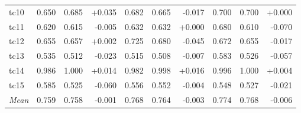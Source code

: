 \begin{table}[ht]
{\begin{tabular}{l rrr rrr rrr}
tc10 & 0.650 & 0.685 & +0.035 & 0.682 & 0.665 & -0.017 & 0.700 & 0.700 & +0.000 \\
tc11 & 0.620 & 0.615 & -0.005 & 0.632 & 0.632 & +0.000 & 0.680 & 0.610 & -0.070 \\
tc12 & 0.655 & 0.657 & +0.002 & 0.725 & 0.680 & -0.045 & 0.672 & 0.655 & -0.017 \\
tc13 & 0.535 & 0.512 & -0.023 & 0.515 & 0.508 & -0.007 & 0.583 & 0.526 & -0.057 \\
tc14 & 0.986 & 1.000 & +0.014 & 0.982 & 0.998 & +0.016 & 0.996 & 1.000 & +0.004 \\
tc15 & 0.585 & 0.525 & -0.060 & 0.556 & 0.552 & -0.004 & 0.548 & 0.527 & -0.021 \\
\midrule
\textit{Mean} & 0.759 & 0.758 & -0.001 & 0.768 & 0.764 & -0.003 & 0.774 & 0.768 & -0.006 \\
\bottomrule
\end{tabular}%
}
\end{table}
